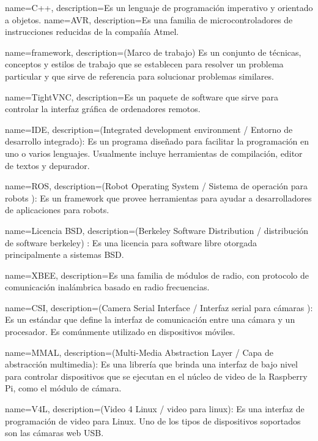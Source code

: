 {
  name=C++,
  description={Es un lenguaje de programaci\'on imperativo y orientado a objetos.}
}
{
  name=AVR,
  description={Es una familia de microcontroladores de instrucciones reducidas de la compañía Atmel.}
}

{
  name=framework,
  description={(Marco de trabajo) Es un conjunto de técnicas, conceptos y estilos de trabajo que se establecen para resolver un problema particular y que sirve de referencia para solucionar problemas similares.}
}

{
  name=TightVNC,
  description={Es un paquete de software que sirve para controlar la interfaz gráfica  de ordenadores remotos.}
}

{
  name=IDE,
  description={(Integrated development environment / Entorno de desarrollo integrado): Es un programa diseñado para facilitar la programación en uno o varios lenguajes. Usualmente incluye herramientas de compilación, editor de textos y depurador.}
}

{
  name=ROS,
  description={(Robot Operating System / Sistema de operación para robots ): Es un framework que provee herramientas para ayudar a desarrolladores de aplicaciones para robots.}
}

{
  name=Licencia BSD,
  description={(Berkeley Software Distribution / distribución de software berkeley) : Es una licencia para software libre otorgada principalmente a sistemas BSD.}
}

{
  name=XBEE,
  description={Es una familia de módulos de radio, con protocolo de comunicación inalámbrica basado en radio frecuencias.}
}

{
  name=CSI,
  description={(Camera Serial Interface / Interfaz serial para cámaras ): Es un estándar que define la interfaz de comunicación entre una cámara y un procesador. Es comúnmente utilizado en dispositivos móviles.}
}
     
{
  name=MMAL,
  description={(Multi-Media Abstraction Layer / Capa de abstracción multimedia): Es una librería que brinda una interfaz de bajo nivel para controlar dispositivos que se ejecutan en el núcleo de video de la Raspberry Pi, como el módulo de cámara.}
}
 
{
  name=V4L,
  description={(Video 4 Linux / video para linux): Es una interfaz de programación de video para Linux. Uno de los tipos de dispositivos soportados son las cámaras web USB.}
}

